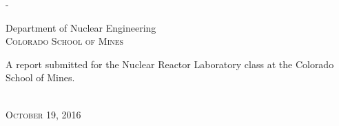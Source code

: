 \begin{titlingpage}
\begin{SingleSpace}
\begin{adjustwidth*}{\unitlength}{-\unitlength}
\begin{center}
\vspace{6mm}
{\large Department of Nuclear Engineering\\
\textsc{Colorado School of Mines}}\\
\vspace{11mm}
\begin{minipage}{10cm}
A report submitted for the Nuclear Reactor Laboratory class at the Colorado School of Mines.
\end{minipage}\\
\vspace{9mm}
{\large\textsc{October 19, 2016}}
\vspace{12mm}
\end{center}
\end{adjustwidth*}
\end{SingleSpace}
\end{titlingpage}
